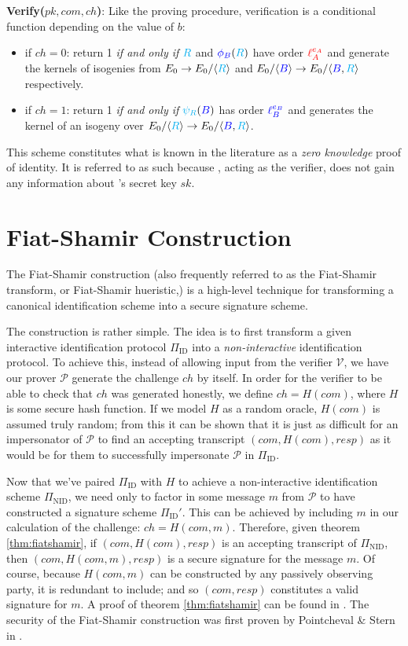 \noindent
\textbf{Verify($pk, com, ch$)}: Like the proving procedure, verification is a conditional function depending on the value of $b$:
\begin{itemize}
\item if $ch = 0$: return 1 \emph{if and only if} $\textcolor{cyan}{R}$ and $\textcolor{blue}{\phi_B}(\textcolor{cyan}{R})$ have order $\textcolor{red}{\ell_{A}^{e_A}}$ and generate the kernels of isogenies from $E_0 \rightarrow E_0/\langle \textcolor{cyan}{R} \rangle$ and $E_0/\langle \textcolor{blue}{B} \rangle \rightarrow E_0/\langle \textcolor{blue}{B}, \textcolor{cyan}{R} \rangle$ respectively.
\item if $ch = 1$: return 1 \emph{if and only if} $\textcolor{cyan}{\psi_R}(\textcolor{blue}{B})$ has order $\textcolor{blue}{\ell_{B}^{e_B}}$ and generates the kernel of an isogeny over $E_0/\langle \textcolor{cyan}{R} \rangle \rightarrow E_0/\langle \textcolor{blue}{B}, \textcolor{cyan}{R} \rangle$.
\end{itemize}

This scheme constitutes what is known in the literature as a \emph{zero knowledge} proof of identity. It is referred to as such because \alice, acting as the verifier, does not gain any information about \bob's secret key $sk$.

\section{Fiat-Shamir Construction}

The Fiat-Shamir construction (also frequently referred to as the Fiat-Shamir transform, or Fiat-Shamir hueristic,) is a high-level technique for transforming a canonical identification scheme into a secure  signature scheme.

The construction is rather simple. The idea is to first transform a given interactive identification protocol $\Pi_{\text{ID}}$ into a \emph{non-interactive} identification protocol. To achieve this, instead of allowing input from the verifier $\mathcal{V}$, we have our prover $\mathcal{P}$ generate the challenge $ch$ by itself. In order for the verifier to be able to check that $ch$ was generated honestly, we define $ch = H(com)$, where $H$ is some secure hash function. If we model $H$ as a random oracle, $H(com)$ is assumed truly random; from this it can be shown that it is just as difficult for an impersonator of $\mathcal{P}$ to find an accepting transcript $(com, H(com), resp)$ as it would be for them to successfully impersonate $\mathcal{P}$ in $\Pi_{\text{ID}}$.

Now that we've paired $\Pi_{\text{ID}}$ with $H$ to achieve a non-interactive identification scheme $\Pi_{\text{NID}}$, we need only to factor in some message $m$ from $\mathcal{P}$ to have constructed a signature scheme $\Pi_{\text{ID}}'$. This can be achieved by including $m$ in our calculation of the challenge: $ch = H(com, m)$. Therefore, given theorem \ref{thm:fiatshamir}, if $(com, H(com), resp)$ is an accepting transcript of $\Pi_{\text{NID}}$, then $(com, H(com, m), resp)$ is a secure signature for the message $m$. Of course, because $H(com, m)$ can be constructed by any passively observing party, it is redundant to include; and so $(com,resp)$ constitutes a valid signature for $m$. A proof of theorem \ref{thm:fiatshamir} can be found in \cite{sigs}. The security of the Fiat-Shamir construction was first proven by Pointcheval \& Stern in \cite{fsproof}.

